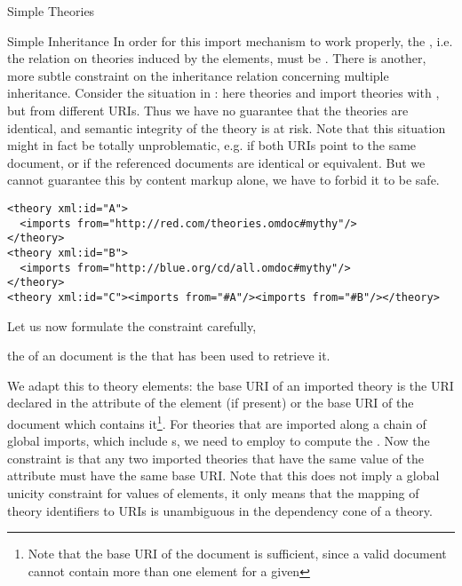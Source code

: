 \begin{module}[id=theories]
\begin{omgroup}{Simple Theories}
\begin{omgroup}[id=inheritance]{Simple Inheritance}
In order for this import mechanism to work properly, the
{}, i.e.  the relation on theories induced by the
 elements, must be {}. There is another, more subtle
constraint on the inheritance relation concerning multiple inheritance.  Consider the
situation in {}: here theories {} and
{} import theories with {}, but from different
URIs. Thus we have no guarantee that the theories are identical, and semantic integrity of
the theory {} is at risk. Note that this situation might in fact be totally
unproblematic, e.g. if both URIs point to the same document, or if the referenced
documents are identical or equivalent. But we cannot guarantee this by content markup
alone, we have to forbid it to be safe.

\begin{lstlisting}[label=lst:multiple-inheritance,
  caption={Problematic Multiple Inheritance},
  index={theory,symbol,axiom,imports}]
<theory xml:id="A">
  <imports from="http://red.com/theories.omdoc#mythy"/>
</theory>
<theory xml:id="B">
  <imports from="http://blue.org/cd/all.omdoc#mythy"/>
</theory>
<theory xml:id="C"><imports from="#A"/><imports from="#B"/></theory>
\end{lstlisting}

Let us now formulate the constraint carefully, 
\begin{definition}[display=flow,id=base.uri.def]
  the  of an {\xml} document is the {} that has been
  used to retrieve it.
\end{definition}
We adapt this to \omdoc theory elements: the base URI of an imported theory is the URI
declared in the  attribute of the  element
(if present) or the base URI of the document which contains it\footnote{Note that the base
  URI of the document is sufficient, since a valid \omdoc document cannot contain more
  than one  element for a given
  }. For theories that are imported along a chain of
global imports, which include {s}, we need to employ
{} to compute the {}.  Now the
constraint is that any two imported theories that have the same value of the
 attribute must have the same base URI. Note that
this does not imply a global unicity constraint for 
values of  elements, it only means that the mapping of theory
identifiers to URIs is unambiguous in the dependency cone of a theory.


\end{omgroup}
\end{omgroup}
\end{module}
